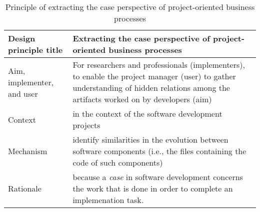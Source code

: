 \begin{table}[]
	\centering
	\caption{Principle of extracting the case perspective of project-oriented business processes}
	\label{tab:case-principle}
	\begin{tabular}{@{}lp{8cm}@{}}
		\toprule
		\textbf{Design principle title} & \textbf{Extracting the case perspective of project-oriented business processes}                                             \\ \midrule
		Aim, implementer, and user &
		For researchers and professionals (implementers), to enable the project manager (user) to gather understanding of hidden relations among the artifacts worked on by developers (aim) \\
		Context                         & in the context of the software development projects                                                                         \\
		Mechanism                       & identify similarities in the evolution between software components (i.e., the files containing the code of such components) \\
		Rationale &
		because a \emph{case} in software development concerns the work that is done in order to complete an implemenation task. 
		\\ \bottomrule
	\end{tabular}
\end{table}